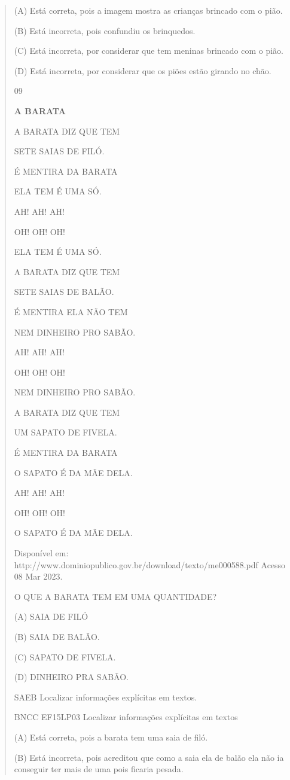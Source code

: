{{{{\begin{verse}
{{\begin{escolha}
{{{{{(A) Está correta, pois a imagem mostra as crianças brincado com o pião.

(B) \protect\hypertarget{_Hlk129156663}{}{}Está incorreta, pois
confundiu os brinquedos.

(C) Está incorreta, por considerar que tem meninas brincado com o pião.

(D) Está incorreta, por considerar que os piões estão girando no chão.

\num{09}

\textbf{A BARATA}

A BARATA DIZ QUE TEM

SETE SAIAS DE FILÓ.

É MENTIRA DA BARATA

ELA TEM É UMA SÓ.

AH! AH! AH!

OH! OH! OH!

ELA TEM É UMA SÓ.

A BARATA DIZ QUE TEM

SETE SAIAS DE BALÃO.

É MENTIRA ELA NÃO TEM

NEM DINHEIRO PRO SABÃO.

AH! AH! AH!

OH! OH! OH!

NEM DINHEIRO PRO SABÃO.

A BARATA DIZ QUE TEM

UM SAPATO DE FIVELA.

É MENTIRA DA BARATA

O SAPATO É DA MÃE DELA.

AH! AH! AH!

OH! OH! OH!

O SAPATO É DA MÃE DELA.

Disponível em:
http://www.dominiopublico.gov.br/download/texto/me000588.pdf Acesso 08
Mar 2023.

O QUE A BARATA TEM EM UMA QUANTIDADE?

(A) SAIA DE FILÓ

(B) SAIA DE BALÃO.

(C) SAPATO DE FIVELA.

(D) DINHEIRO PRA SABÃO.

SAEB Localizar informações explícitas em textos.

BNCC EF15LP03 Localizar informações explícitas em textos

(A) Está correta, pois a barata tem uma saia de filó.

(B) Está incorreta, pois acreditou que como a saia ela de balão ela não
ia conseguir ter mais de uma pois ficaria pesada.

}}}}}
\end{escolha}}}
\end{verse}}}}}
